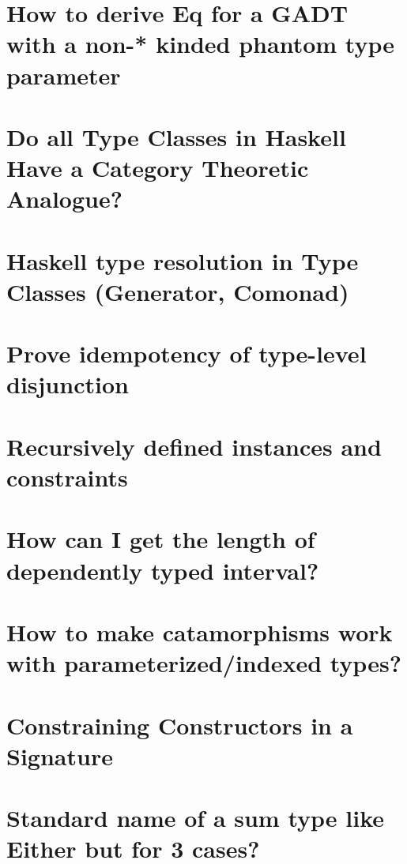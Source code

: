 \documentclass{book}%
\begin{document}
\section{How to derive Eq for a GADT with a non-* kinded phantom type parameter}


\section{Do all Type Classes in Haskell Have a Category Theoretic Analogue?}


\section{Haskell type resolution in Type Classes (Generator, Comonad)}


\section{Prove idempotency of type-level disjunction}


\section{Recursively defined instances and constraints}


\section{How can I get the length of dependently typed interval?}


\section{How to make catamorphisms work with parameterized/indexed types?}


\section{Constraining Constructors in a Signature}


\section{Standard name of a sum type like Either but for 3 cases?}

\end{document}
